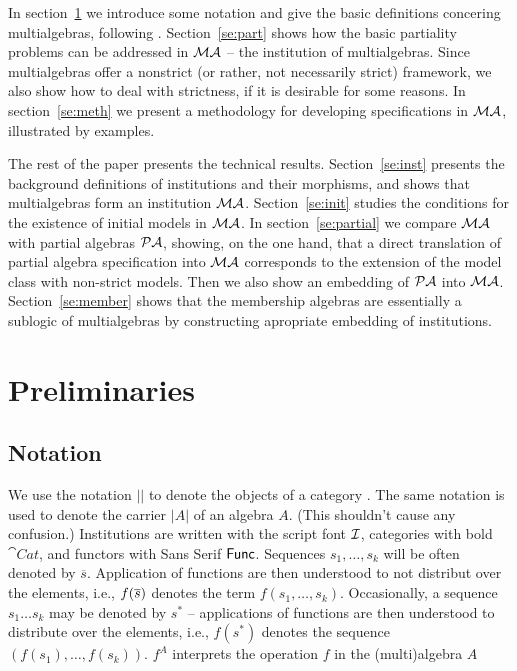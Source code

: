 \documentclass[10pt]{article}
\begin{document}
In section~\ref{se:pre} we introduce some notation and give the basic
definitions concering multialgebras, following \cite{multi}.
Section~\ref{se:part} shows how the basic partiality problems can be
addressed in ${\mathcal{MA}}$ -- the institution of multialgebras.  Since
multialgebras offer a nonstrict (or rather, not necessarily strict)
framework, we also show how to deal with strictness, if it is desirable for
some reasons.  In section~\ref{se:meth} we present a methodology for
developing specifications in ${\mathcal{MA}}$, illustrated by examples.

The rest of the paper presents the technical results.  Section~\ref{se:inst}
presents the background definitions of institutions \cite{inst} and their
morphisms, and shows that multialgebras form an institution
${\mathcal{MA}}$. Section~\ref{se:init} studies the conditions for the existence
of initial models in ${\mathcal{MA}}$. In section~\ref{se:partial} we compare
${\mathcal{MA}}$ with partial algebras ${\mathcal{PA}}$, showing, on the one hand, that
a direct translation of partial algebra specification into ${\mathcal{MA}}$
corresponds to the extension of the model class with non-strict models. Then
we also show an embedding of ${\mathcal{PA}}$ into ${\mathcal{MA}}$.
Section~\ref{se:member} shows that the membership algebras \cite{member} are essentially a sublogic of
multialgebras by constructing apropriate embedding of institutions.

  
\section{Preliminaries}\label{se:pre}

\subsection{Notation}
We use the notation $|${}$|$ to denote the objects of a category
. The same notation is used to denote the carrier $|A|$ of an algebra
$A$. (This shouldn't cause any confusion.)  Institutions are written with
the script font ${\mathcal{I}}$, categories with bold $\cat{Cat}$, and functors with
Sans Serif ${\sf {Func}}$.  Sequences $s_1, \ldots, s_k$ will be often denoted
by $\overline{s}$. Application of functions are then understood to not
distribut over the elements, i.e., $f(\overline{s})$ denotes the term
$f(s_1,\ldots, s_k)$.  
Occasionally, a sequence $s_1 \ldots s_k$ may be denoted by $s^*$ -- 
applications of functions are then understood to
distribute over the elements, i.e., $f(s^*)$ denotes the sequence
$(f(s_1),\ldots, f(s_k))$. $f^A$ interprets the operation $f$ in the (multi)algebra $A$
\end{document}
